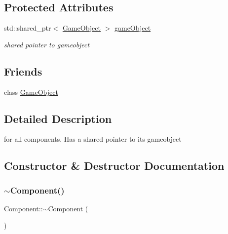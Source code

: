 \subsection*{Protected Attributes}
\begin{DoxyCompactItemize}
\item 
std\+::shared\+\_\+ptr$<$ \hyperlink{class_mason_1_1_game_object}{Game\+Object} $>$ \hyperlink{class_mason_1_1_component_abaa67b569d0a70e26a4606f4a099a925}{game\+Object}
\begin{DoxyCompactList}\small\item\em shared pointer to gameobject \end{DoxyCompactList}\end{DoxyCompactItemize}
\subsection*{Friends}
\begin{DoxyCompactItemize}
\item 
class \hyperlink{class_mason_1_1_component_a00df87c957d8f7ee0fc51f07a0542f4a}{Game\+Object}
\end{DoxyCompactItemize}


\subsection{Detailed Description}
for all components. Has a shared pointer to its gameobject 

\subsection{Constructor \& Destructor Documentation}
\hypertarget{class_mason_1_1_component_ab8378fa275af98e568a7e91d33d867af}{}\label{class_mason_1_1_component_ab8378fa275af98e568a7e91d33d867af} 
\subsubsection{\texorpdfstring{$\sim$\+Component()}{~Component()}}
{\footnotesize\ttfamily Component\+::$\sim$\+Component (\begin{DoxyParamCaption}{ }\end{DoxyParamCaption})\hspace{0.3cm}{\ttfamily [virtual]}}



